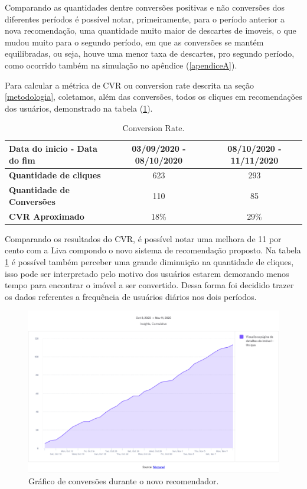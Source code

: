 Comparando as quantidades dentre conversões positivas e não conversões dos diferentes períodos é possível notar, primeiramente, para o período anterior a nova recomendação, uma quantidade muito maior de descartes de imoveis, o que mudou muito para o segundo período, em que as conversões se mantém equilibradas, ou seja, houve uma menor taxa de descartes, pro segundo período, como ocorrido também na simulação no apêndice (\ref{apendiceA}).

Para calcular a métrica de CVR ou conversion rate descrita na seção \ref{metodologia}, coletamos, além das conversões, todos os cliques em recomendações dos usuários, demonstrado na tabela (\ref{tab:my-table3}).

\begin{table}[H]
\centering
\caption[Conversion Rate]{Conversion Rate.}
\begin{tabular}{lcc}
\hline
\textbf{Data do inicio - Data do fim} & 03/09/2020 - 08/10/2020 & 08/10/2020 - 11/11/2020 \\ \hline
\textbf{Quantidade de cliques} & 623 & 293 \\ \hline
\textbf{Quantidade de Conversões} & 110 & 85 \\ \hline
\textbf{CVR Aproximado} & 18\% & 29\% \\ \hline
\end{tabular}
\label{tab:my-table3}
\end{table}

Comparando os resultados do CVR, é possível notar uma melhora de 11 por cento com a Liva compondo o novo sistema de recomendação proposto. Na tabela \ref{tab:my-table3} é possível também perceber uma grande diminuição na quantidade de cliques, isso pode ser interpretado pelo motivo dos usuários estarem demorando menos tempo para encontrar o imóvel a ser convertido. Dessa forma foi decidido trazer os dados referentes a frequência de usuários diários nos dois períodos.

\begin{figure}[H]
    \centering
    \includegraphics[scale=0.38]{figuras/desenvolvimento/mixpanel-antes.png}
    \caption[Gráfico de conversões durante o novo recomendador]{Gráfico de conversões durante o novo recomendador.}
    \label{fig:mixpanel-antes}
\end{figure}

